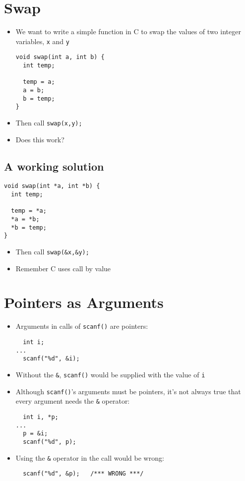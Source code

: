 \documentclass{article}
\begin{document}
\section{Swap}
\begin{itemize}
\item We want to write a simple function in C to swap the values of two integer variables, \verb!x! and \verb!y!

\begin{verbatim}
void swap(int a, int b) {
  int temp;
  
  temp = a;
  a = b;
  b = temp;
}
\end{verbatim}

\item Then call \verb!swap(x,y);!
\item Does this work?
\end{itemize}



\subsection{A working solution}
\begin{verbatim}
void swap(int *a, int *b) {
  int temp;
  
  temp = *a;
  *a = *b;
  *b = temp;
}
\end{verbatim}

\begin{itemize}
\item Then call \verb!swap(&x,&y);!
\item Remember C uses call by value 
\end{itemize}



\section{Pointers as Arguments}
\begin{itemize}
\item Arguments in calls of \verb!scanf()! are pointers:

\begin{verbatim}
  int i;
...
  scanf("%d", &i);
\end{verbatim}

\item Without the \verb!&!, \verb!scanf()! would be supplied with the value of \verb!i!

\item Although \verb!scanf()!'s arguments must be pointers, it's not always true that every argument needs the \verb!&! operator:
\begin{verbatim}
  int i, *p;
...
  p = &i;
  scanf("%d", p);
\end{verbatim}

\item Using the \verb!&! operator in the call would be wrong:
\begin{verbatim}
  scanf("%d", &p);   /*** WRONG ***/
\end{verbatim}
\end{itemize}
\end{document}
